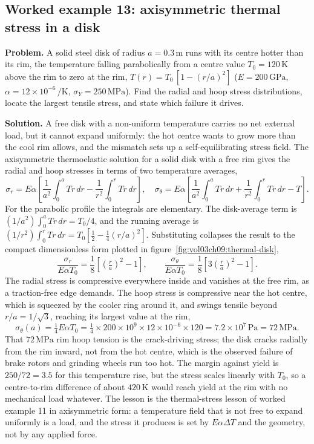 \subsection*{Worked example 13: axisymmetric thermal stress in a disk}



\textbf{Problem.} A solid steel disk of radius $a = 0.3\,\si{\meter}$ runs
with its centre hotter than its rim, the temperature falling parabolically
from a centre value $T_0 = 120\,\si{\kelvin}$ above the rim to zero at the
rim, $T(r) = T_0\,[1 - (r/a)^2]$ ($E = 200\,\text{GPa}$, $\alpha = 12\times
10^{-6}\,\si{\per\kelvin}$, $\sigma_Y = 250\,\text{MPa}$). Find the radial
and hoop stress distributions, locate the largest tensile stress, and
state which failure it drives.

\textbf{Solution.} A free disk with a non-uniform temperature carries no
net external load, but it cannot expand uniformly: the hot centre wants to
grow more than the cool rim allows, and the mismatch sets up a
self-equilibrating stress field. The axisymmetric thermoelastic solution
for a solid disk with a free rim gives the radial and hoop stresses in
terms of two temperature averages,
\[
\sigma_r = E\alpha\!\left[\frac{1}{a^2}\!\int_0^a T r\,dr
- \frac{1}{r^2}\!\int_0^r T r\,dr\right],
\quad
\sigma_\theta = E\alpha\!\left[\frac{1}{a^2}\!\int_0^a T r\,dr
+ \frac{1}{r^2}\!\int_0^r T r\,dr - T\right].
\]
For the parabolic profile the integrals are elementary. The disk-average
term is $(1/a^2)\int_0^a T r\,dr = T_0/4$, and the running average is
$(1/r^2)\int_0^r T r\,dr = T_0[\tfrac12 - \tfrac14 (r/a)^2]$. Substituting
collapses the result to the compact dimensionless form plotted in
figure~\ref{fig:vol03ch09:thermal-disk},
\[
\frac{\sigma_r}{E\alpha T_0} = \frac{1}{8}\!\left[\left(\tfrac{r}{a}
\right)^2 - 1\right],
\qquad
\frac{\sigma_\theta}{E\alpha T_0} = \frac{1}{8}\!\left[3\left(\tfrac{r}{a}
\right)^2 - 1\right].
\]
The radial stress is compressive everywhere inside and vanishes at the
free rim, as a traction-free edge demands. The hoop stress is compressive
near the hot centre, which is squeezed by the cooler ring around it, and
swings tensile beyond $r/a = 1/\sqrt 3$, reaching its largest value at the
rim,
\[
\sigma_{\theta}(a) = \tfrac{1}{4} E\alpha T_0
= \tfrac{1}{4}\times 200\times 10^9 \times 12\times 10^{-6}\times 120
= 7.2\times 10^7\,\text{Pa} = 72\,\text{MPa}.
\]
That $72\,\text{MPa}$ rim hoop tension is the crack-driving stress; the
disk cracks radially from the rim inward, not from the hot centre, which
is the observed failure of brake rotors and grinding wheels run too hot.
The margin against yield is $250/72 = 3.5$ for this temperature rise, but
the stress scales linearly with $T_0$, so a centre-to-rim difference of
about $420\,\si{\kelvin}$ would reach yield at the rim with no mechanical
load whatever. The lesson is the thermal-stress lesson of worked example
11 in axisymmetric form: a temperature field that is not free to expand
uniformly is a load, and the stress it produces is set by $E\alpha\Delta T$
and the geometry, not by any applied force.

